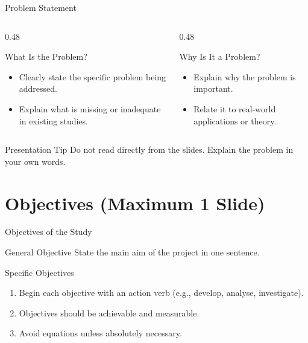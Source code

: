 \documentclass[aspectratio=169,12pt]{beamer}
\begin{document}
	\begin{frame}{Problem Statement}
		\begin{columns}[T]
			\begin{column}{0.48\textwidth}
				\begin{block}{What Is the Problem?}
					\begin{itemize}
						\item Clearly state the specific problem being addressed.
						\item Explain what is missing or inadequate in existing studies.
					\end{itemize}
				\end{block}
			\end{column}
			
			\begin{column}{0.48\textwidth}
				\begin{block}{Why Is It a Problem?}
					\begin{itemize}
						\item Explain why the problem is important.
						\item Relate it to real-world applications or theory.
					\end{itemize}
				\end{block}
			\end{column}
		\end{columns}
		
		\begin{alertblock}{Presentation Tip}
			Do not read directly from the slides. Explain the problem in your own words.
		\end{alertblock}
	\end{frame}
	
	\section{Objectives  (Maximum 1 Slide)}
	
	\begin{frame}{Objectives of the Study}
		\begin{block}{General Objective}
			State the main aim of the project in one sentence.
		\end{block}
		
		\begin{block}{Specific Objectives}
			\begin{enumerate}
				\item Begin each objective with an action verb (e.g., develop, analyse, investigate).
				\item Objectives should be achievable and measurable.
				\item Avoid equations unless absolutely necessary.
			\end{enumerate}
		\end{block}
	\end{frame}
	
\end{document}
